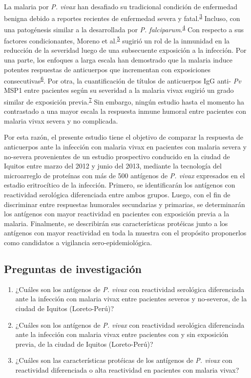 \documentclass[]{article}
\begin{document}
La malaria por \emph{P. vivax} han desafiado su tradicional condición de
enfermedad benigna debido a reportes recientes de enfermedad severa y
fatal.\textsuperscript{\protect\hyperlink{ref-quispe2014}{3}} Incluso,
con una patogénesis similar a la desarrollada por \emph{P.
falciparum}.\textsuperscript{\protect\hyperlink{ref-barber2015}{4}} Con
respecto a sus factores condicionantes, Moreno et
al.\textsuperscript{\protect\hyperlink{ref-Moreno2013}{5}} sugirió un
rol de la inmunidad en la reducción de la severidad luego de una
subsecuente exposición a la infección. Por una parte, los enfoques a
larga escala han demostrado que la malaria induce potentes respuestas de
anticuerpos que incrementan con exposiciones
consecutivas\textsuperscript{\protect\hyperlink{ref-crompton2010}{6}}.
Por otra, la cuantificación de títulos de anticuerpos IgG anti-
\emph{Pv} MSP1 entre pacientes según su severidad a la malaria vivax
sugirió un grado similar de exposición
previa.\textsuperscript{\protect\hyperlink{ref-baldevi2013}{7}} Sin
embargo, ningún estudio hasta el momento ha contrastado a una mayor
escala la respuesta inmune humoral entre pacientes con malaria vivax
severa y no complicada.

Por esta razón, el presente estudio tiene el objetivo de comparar la
respuesta de anticuerpos ante la infección con malaria vivax en
pacientes con malaria severa y no-severa provenientes de un estudio
prospectivo conducido en la ciudad de Iquitos entre marzo del 2012 y
junio del 2013, mediante la tecnología del microarreglo de proteínas con
más de 500 antígenos de \emph{P. vivax} expresados en el estadio
eritrocítico de la infección. Primero, se identificarán los antígenos
con reactividad serológica diferenciada entre ambos grupos. Luego, con
el fin de discriminar entre respuestas humorales secundarias y
primarias, se determinarán los antígenos con mayor reactividad en
pacientes con exposición previa a la malaria. Finalmente, se describirán
sus características protéicas junto a los antígenos con mayor
reactividad en toda la muestra con el propósito proponerlos como
candidatos a vigilancia sero-epidemiológica.

\subsection{Preguntas de
investigación}\label{preguntas-de-investigacion}

\begin{enumerate}
\def\labelenumi{\arabic{enumi}.}
\item
  ¿Cuáles son los antígenos de \emph{P. vivax} con reactividad
  serológica diferenciada ante la infección con malaria vivax entre
  pacientes severos y no-severos, de la ciudad de Iquitos (Loreto-Perú)?
\item
  ¿Cuáles son los antígenos de \emph{P. vivax} con reactividad
  serológica diferenciada ante la infección con malaria vivax entre
  pacientes con y sin exposición previa, de la ciudad de Iquitos
  (Loreto-Perú)?
\item
  ¿Cuáles son las características protéicas de los antígenos de \emph{P.
  vivax} con reactividad diferenciada o alta reactividad en pacientes
  con malaria vivax?
\end{enumerate}
\end{document}

